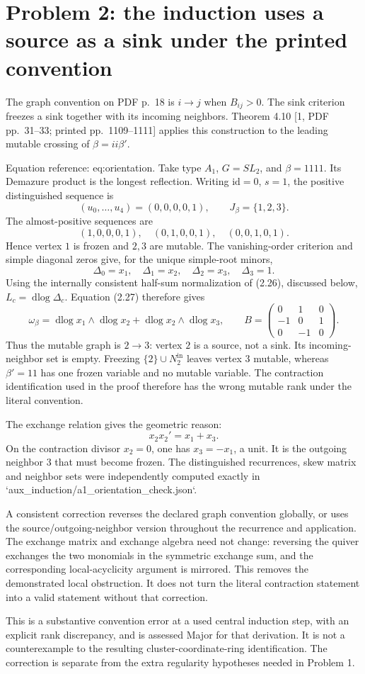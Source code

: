 \documentclass[10pt]{article}
\begin{document}
\section*{Problem 2: the induction uses a source as a sink under the printed convention}
The graph convention on PDF p. 18 is \(i\to j\) when \(B_{ij}>0\). The sink criterion freezes a sink together with its incoming neighbors. Theorem 4.10 [1, PDF pp. 31–33; printed pp. 1109–1111] applies this construction to the leading mutable crossing of \(\beta=ii\beta'\).\par
Equation reference: eq:orientation. Take type \(A_1\), \(G=SL_2\), and \(\beta=1111\). Its Demazure product is the longest reflection. Writing \(\mathrm{id}=0\), \(s=1\), the positive distinguished sequence is \[(u_0,\ldots,u_4)=(0,0,0,0,1),\qquad J_\beta=\{1,2,3\}.\] The almost-positive sequences are \[(1,0,0,0,1),\quad(0,1,0,0,1),\quad(0,0,1,0,1).\] Hence vertex \(1\) is frozen and \(2,3\) are mutable. The vanishing-order criterion and simple diagonal zeros give, for the unique simple-root minors, \[\Delta_0=x_1,\quad\Delta_1=x_2,\quad\Delta_2=x_3,\quad\Delta_3=1.\] Using the internally consistent half-sum normalization of (2.26), discussed below, \(L_c=\operatorname{dlog}\Delta_c\). Equation (2.27) therefore gives \[
 \omega_\beta=\operatorname{dlog}x_1\wedge\operatorname{dlog}x_2+
                 \operatorname{dlog}x_2\wedge\operatorname{dlog}x_3,\qquad
 B=\begin{pmatrix}0&1&0\\-1&0&1\\0&-1&0\end{pmatrix}.\] Thus the mutable graph is \(2\to3\): vertex \(2\) is a source, not a sink. Its incoming-neighbor set is empty. Freezing \(\{2\}\cup N_2^{\mathrm{in}}\) leaves vertex \(3\) mutable, whereas \(\beta'=11\) has one frozen variable and no mutable variable. The contraction identification used in the proof therefore has the wrong mutable rank under the literal convention.\par
The exchange relation gives the geometric reason: \[x_2x_2'=x_1+x_3.\] On the contraction divisor \(x_2=0\), one has \(x_3=-x_1\), a unit. It is the outgoing neighbor \(3\) that must become frozen. The distinguished recurrences, skew matrix and neighbor sets were independently computed exactly in `aux\_induction/a1\_orientation\_check.json`.\par
A consistent correction reverses the declared graph convention globally, or uses the source/outgoing-neighbor version throughout the recurrence and application. The exchange matrix and exchange algebra need not change: reversing the quiver exchanges the two monomials in the symmetric exchange sum, and the corresponding local-acyclicity argument is mirrored. This removes the demonstrated local obstruction. It does not turn the literal contraction statement into a valid statement without that correction.\par
This is a substantive convention error at a used central induction step, with an explicit rank discrepancy, and is assessed Major for that derivation. It is not a counterexample to the resulting cluster-coordinate-ring identification. The correction is separate from the extra regularity hypotheses needed in Problem 1.\par
\end{document}
